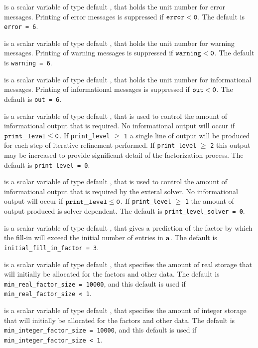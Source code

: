 \documentclass{galahad}
\begin{document}
\begin{description}

 is a scalar variable of type default \integer, that holds the 
unit number for error messages. 
Printing of error messages is suppressed if ${\tt error} < {\tt 0}$. 
The default is {\tt error = 6}.
 
 is a scalar variable of type default \integer, that holds the 
unit number for warning messages. 
Printing of warning messages is suppressed if ${\tt warning} < {\tt 0}$. 
The default is {\tt warning = 6}.
 
 is a scalar variable of type default \integer, that holds the 
unit number for informational messages. 
Printing of informational messages is suppressed if ${\tt out} < {\tt 0}$. 
The default is {\tt out = 6}.
 
 is a scalar variable of type default \integer, 
that is used 
to control the amount of informational output that is required. No  
informational output will occur if ${\tt print\_level} \leq {\tt 0}$. If  
{\tt print\_level} $\geq$ {\tt 1} a single line of output will be produced 
for each step of iterative refinement performed. 
If {\tt print\_level} $\geq$ {\tt 2} this output 
may be increased to provide significant detail of the factorization process.
The default is {\tt print\_level = 0}.
 
 is a scalar variable of type default \integer, 
that is used 
to control the amount of informational output that is required by the exteral
solver. No  
informational output will occur if ${\tt print\_level} \leq {\tt 0}$. If  
{\tt print\_level} $\geq$ {\tt 1} the amount of output produced is solver
dependent.
The default is {\tt print\_level\_solver = 0}.
 
 is a scalar variable of type default \integer,
that gives a prediction of the factor by which the fill-in will exceed 
the initial number of entries in ${\mathbf{a}}$.
The default is {\tt initial\_fill\_in\_factor = 3}.

 is a scalar variable of type default \integer,
that specifies the amount of real storage that will initially be 
allocated for the factors and other data.
The default is {\tt min\_real\_factor\_size = 10000}, 
and this default is used if {\tt min\_real\_factor\_size < 1}.

 is a scalar variable of type default \integer,
that specifies the amount of integer storage that will initially be 
allocated for the factors and other data.
The default is {\tt min\_integer\_factor\_size = 10000},
and this default is used if {\tt min\_integer\_factor\_size < 1}.


\end{description}
\end{document}
